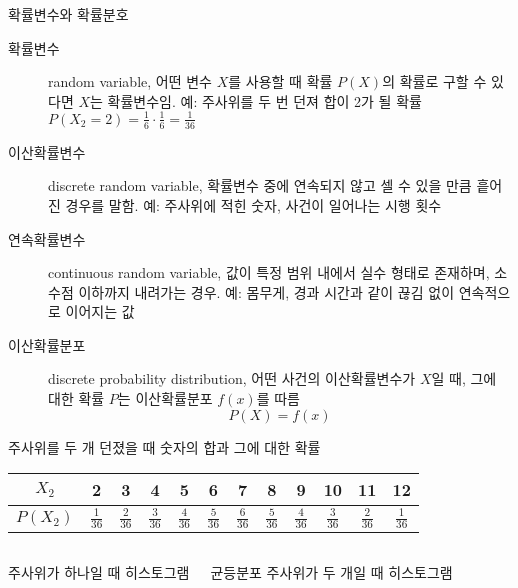 \documentclass[10pt,t]{beamer}
\begin{document}
\begin{frame} {확률변수와 확률분호}
\begin{description}
    \item[확률변수] random variable, 어떤 변수 $X$를 사용할 때 확률 $P(X)$의 확률로 구할 수 있다면 $X$는 확률변수임. 예: 주사위를 두 번 던져 합이 2가 될 확률 $P(X_2 = 2) = \frac{1}{6} \cdot \frac{1}{6} = \frac{1}{36}$
    \item[이산확률변수] discrete random variable, 확률변수 중에 연속되지 않고 셀 수 있을 만큼 흩어진 경우를 말함. 예: 주사위에 적힌 숫자, 사건이 일어나는 시행 횟수
    \item[연속확률변수] continuous random variable, 값이 특정 범위 내에서 실수 형태로 존재하며, 소수점 이하까지 내려가는 경우. 예: 몸무게, 경과 시간과 같이 끊김 없이 연속적으로 이어지는 값
    \item[이산확률분포] discrete probability distribution, 어떤 사건의 이산확률변수가 $X$일 때, 그에 대한 확률 $P$는 이산확률분포 $f(x)$를 따름 \[P(X)=f(x)\]
\end{description}


주사위를 두 개 던졌을 때 숫자의 합과 그에 대한 확률

\begin{tabular}{*{12}{|c}|}\hline
    $X_2$ & 2 & 3& 4& 5 & 6& 7& 8& 9& 10 & 11 & 12 \\ \hline
    $P(X_2)$ & $\frac{1}{36}$ & $\frac{2}{36}$ & $\frac{3}{36}$ & $\frac{4}{36}$ & $\frac{5}{36}$ & $\frac{6}{36}$ & $\frac{5}{36}$ & $\frac{4}{36}$ & $\frac{3}{36}$ & $\frac{2}{36}$ & $\frac{1}{36}$  \\ \hline
\end{tabular}

\pagebreak
\begin{columns}
    주사위가 하나일 때 히스토그램

    균등분포
    주사위가 두 개일 때 히스토그램


\end{columns}
\end{frame}
\end{document}
